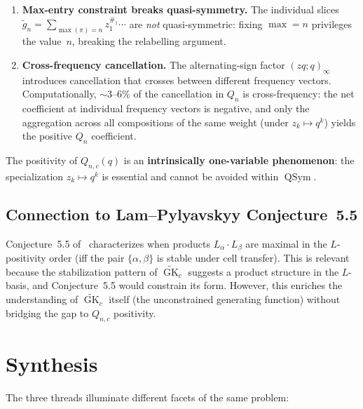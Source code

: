 \documentclass[11pt]{article}
\newcommand{\GK}{\operatorname{GK}}
\newcommand{\QSym}{\operatorname{QSym}}
\begin{document}
\begin{enumerate}
  \item \textbf{Max-entry constraint breaks quasi-symmetry.}
    The individual slices
    $\tilde{g}_n = \sum_{\max(\pi) = n} z_1^{\#_1} \cdots$
    are \emph{not} quasi-symmetric: fixing $\max = n$ privileges
    the value~$n$, breaking the relabelling argument.
  \item \textbf{Cross-frequency cancellation.}
    The alternating-sign factor $(zq;q)_\infty$ introduces
    cancellation that crosses between different frequency vectors.
    Computationally, $\sim$3--6\% of the cancellation in $Q_n$ is
    cross-frequency: the net coefficient at individual frequency
    vectors is negative, and only the aggregation across all
    compositions of the same weight (under $z_k \mapsto q^k$)
    yields the positive $Q_n$ coefficient.
\end{enumerate}

The positivity of $Q_{n,c}(q)$ is an
\textbf{intrinsically one-variable phenomenon}: the
specialization $z_k \mapsto q^k$ is essential and cannot be
avoided within $\QSym$.

\subsection{Connection to Lam--Pylyavskyy Conjecture~5.5}

Conjecture~5.5 of~\cite{lam-pylyavskyy-2006} characterizes when
products $L_\alpha \cdot L_\beta$ are maximal in the
$L$-positivity order (iff the pair $\{\alpha, \beta\}$ is stable
under cell transfer). This is relevant because the stabilization
pattern of $\widetilde{\GK}_c$ suggests a product structure in
the $L$-basis, and Conjecture~5.5 would constrain its form.
However, this enriches the understanding of $\widetilde{\GK}_c$
itself (the unconstrained generating function) without bridging
the gap to $Q_{n,c}$ positivity.

\section{Synthesis}
\label{sec:synthesis}

The three threads illuminate different facets of the same problem:
\end{document}
